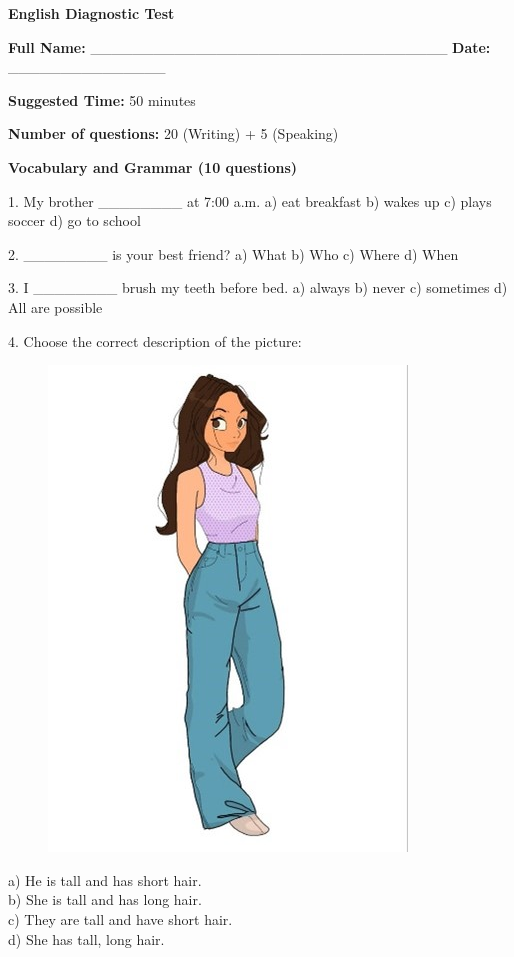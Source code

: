 \documentclass[12pt, a4paper]{article}
\begin{document}
\begin{center}
    \Large \textbf{English Diagnostic Test} \\[1ex]
\end{center}

\bigskip

\textbf{Full Name:} \_\_\_\_\_\_\_\_\_\_\_\_\_\_\_\_\_\_\_\_\_\_\_\_\_\_\_\_\_\_\_\_\_\_ \hfill
\textbf{Date:} \_\_\_\_\_\_\_\_\_\_\_\_\_\_\_

\textbf{Suggested Time:} 50 minutes

\smallskip

\textbf{Number of questions:} 20 (Writing) + 5 (Speaking)

\vspace{1em}

\begin{center}
    \large \textbf{Vocabulary and Grammar (10 questions)}
\end{center}

1. My brother \_\_\_\_\_\_\_\_ at 7:00 a.m.
a) eat breakfast \quad b) wakes up \quad c) plays soccer \quad d) go to school

\smallskip

2. \_\_\_\_\_\_\_\_ is your best friend?
a) What \quad b) Who \quad c) Where \quad d) When

\smallskip

3. I \_\_\_\_\_\_\_\_ brush my teeth before bed.
a) always \quad b) never \quad c) sometimes \quad d) All are possible

\smallskip

4. Choose the correct description of the picture:\\

\begin{figure}[H]
    \includegraphics[width=.3\linewidth]{../../../images/Point4-EnglishExam.jpg}
\end{figure}

\medskip{}

a) He is tall and has short hair. \\ b) She is tall and has long hair. \\ c)
They are tall and have short hair. \\ d) She has tall, long hair.
\end{document}

